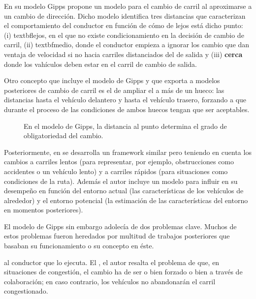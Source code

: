 En su modelo Gipps propone un modelo para el cambio de carril al aproximarse a un cambio de dirección. Dicho modelo identifica tres distancias que caracterizan el comportamiento del conductor en función de cómo de lejos está dicho punto: (i) textbf{lejos}, en el que no existe condicionamiento en la decisión de cambio de carril, (ii) textbf{medio}, donde el conductor empieza a ignorar los cambio que dan ventaja de velocidad si no hacia carriles distanciados del de salida y (iii) \textbf{cerca} donde los vahículos deben estar en el carril de cambio de salida.

Otro concepto que incluye el modelo de Gipps y que exporta a modelos posteriores de cambio de carril es el de ampliar el \textit{} a más de un hueco: las distancias hasta el vehículo delantero y hasta el vehículo trasero, forzando a que durante el proceso de  las condiciones de ambos huecos tengan que ser aceptables.

\begin{figure}
	\caption{En el modelo de Gipps, la distancia al punto determina el grado de obligatoriedad del cambio.}
	\label{fig:lane-change-type-depending-on-the-distance}
\end{figure}

Posteriormente, en \cite{wiedemann1992microscopic} se desarrolla un framework similar pero teniendo en cuenta los cambios a carriles lentos (para representar, por ejemplo, obstrucciones como accidentes o un vehículo lento) y a carriles rápidos (para situaciones como condiciones de la ruta). Además el autor incluye un modelo para influir en su desempeño en función del entorno actual (las características de los vehículos de alrededor) y el entorno potencial (la estimación de las características del entorno en momentos posteriores).

El modelo de Gipps sin embargo adolecía de dos problemas clave. Muchos de estos problemas fueron heredados por multitud de trabajos posteriores que basaban su funcionamiento o su concepto en éste.

 al conductor que lo ejecuta. El \cite{Hidas2002}, el autor resalta el problema de que, en situaciones de congestión, el cambio ha de ser o bien forzado o bien a través de colaboración; en caso contrario, los vehículos no abandonarán el carril congestionado.

